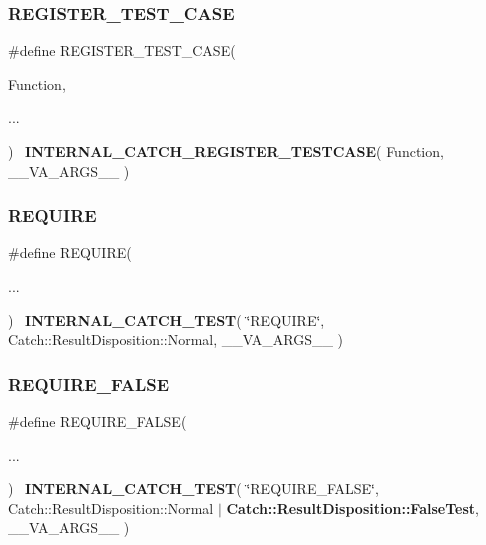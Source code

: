 \mbox{\label{catch_8hpp_a784b9192db328b4f21186f9b26e4146e}} 
\subsubsection{REGISTER\_TEST\_CASE}
{\footnotesize\ttfamily \#define R\+E\+G\+I\+S\+T\+E\+R\+\_\+\+T\+E\+S\+T\+\_\+\+C\+A\+SE(\begin{DoxyParamCaption}\item[{}]{Function,  }\item[{}]{... }\end{DoxyParamCaption})~\textbf{ I\+N\+T\+E\+R\+N\+A\+L\+\_\+\+C\+A\+T\+C\+H\+\_\+\+R\+E\+G\+I\+S\+T\+E\+R\+\_\+\+T\+E\+S\+T\+C\+A\+SE}( Function, \+\_\+\+\_\+\+V\+A\+\_\+\+A\+R\+G\+S\+\_\+\+\_\+ )}

\mbox{\label{catch_8hpp_ad57835ba8f1bb419a865ada6bd011a85}} 
\subsubsection{REQUIRE}
{\footnotesize\ttfamily \#define R\+E\+Q\+U\+I\+RE(\begin{DoxyParamCaption}\item[{}]{... }\end{DoxyParamCaption})~\textbf{ I\+N\+T\+E\+R\+N\+A\+L\+\_\+\+C\+A\+T\+C\+H\+\_\+\+T\+E\+ST}( \char`\"{}R\+E\+Q\+U\+I\+RE\char`\"{}, Catch\+::\+Result\+Disposition\+::\+Normal, \+\_\+\+\_\+\+V\+A\+\_\+\+A\+R\+G\+S\+\_\+\+\_\+  )}

\mbox{\label{catch_8hpp_ada5065594bafc152162761ace47c1dcb}} 
\subsubsection{REQUIRE\_FALSE}
{\footnotesize\ttfamily \#define R\+E\+Q\+U\+I\+R\+E\+\_\+\+F\+A\+L\+SE(\begin{DoxyParamCaption}\item[{}]{... }\end{DoxyParamCaption})~\textbf{ I\+N\+T\+E\+R\+N\+A\+L\+\_\+\+C\+A\+T\+C\+H\+\_\+\+T\+E\+ST}( \char`\"{}R\+E\+Q\+U\+I\+R\+E\+\_\+\+F\+A\+L\+SE\char`\"{}, Catch\+::\+Result\+Disposition\+::\+Normal $\vert$ \textbf{ Catch\+::\+Result\+Disposition\+::\+False\+Test}, \+\_\+\+\_\+\+V\+A\+\_\+\+A\+R\+G\+S\+\_\+\+\_\+ )}

